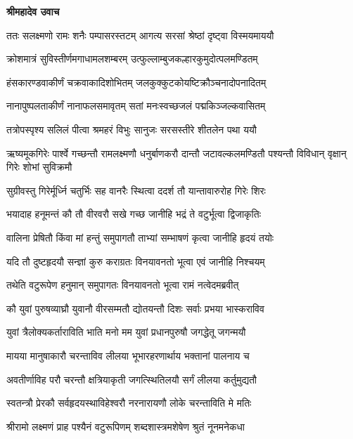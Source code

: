 




\textbf{श्रीमहादेव उवाच}

\twolineshloka
{ततः सलक्ष्मणो रामः शनैः पम्पासरस्तटम्}
{आगत्य सरसां श्रेष्ठां दृष्ट्वा विस्मयमाययौ} %

\twolineshloka
{क्रोशमात्रं सुविस्तीर्णमगाधामलशम्बरम्}
{उत्फुल्लाम्बुजकल्हारकुमुदोत्पलमण्डितम्} %

\twolineshloka
{हंसकारण्डवाकीर्णं चक्रवाकादिशोभितम्}
{जलकुक्कुटकोयष्टिक्रौञ्चनादोपनादितम्} %

\twolineshloka
{नानापुष्पलताकीर्णं नानाफलसमावृतम्}
{सतां मनःस्वच्छजलं पद्मकिञ्जल्कवासितम्} %

\twolineshloka
{तत्रोपस्पृश्य सलिलं पीत्वा श्रमहरं विभुः}
{सानुजः सरसस्तीरे शीतलेन पथा ययौ} %

\threelineshloka
{ऋष्यमूकगिरेः पार्श्वे गच्छन्तौ रामलक्ष्मणौ}
{धनुर्बाणकरौ दान्तौ जटावल्कलमण्डितौ}
{पश्यन्तौ विविधान् वृक्षान् गिरेः शोभां सुविक्रमौ} %

\twolineshloka
{सुग्रीवस्तु गिरेर्मूर्ध्नि चतुर्भिः सह वानरैः}
{स्थित्वा ददर्श तौ यान्तावारुरोह गिरेः शिरः} %

\twolineshloka
{भयादाह हनूमन्तं कौ तौ वीरवरौ सखे}
{गच्छ जानीहि भद्रं ते वटुर्भूत्वा द्विजाकृतिः} %

\twolineshloka
{वालिना प्रेषितौ किंवा मां हन्तुं समुपागतौ}
{ताभ्यां सम्भाषणं कृत्वा जानीहि हृदयं तयोः} %

\twolineshloka
{यदि तौ दुष्टहृदयौ सन्ज्ञां कुरु कराग्रतः}
{विनयावनतो भूत्वा एवं जानीहि निश्चयम्} %

\twolineshloka
{तथेति वटुरूपेण हनुमान् समुपागतः}
{विनयावनतो भूत्वा रामं नत्वेदमब्रवीत्} %

\twolineshloka
{कौ युवां पुरुषव्याघ्रौ युवानौ वीरसम्मतौ}
{द्योतयन्तौ दिशः सर्वाः प्रभया भास्कराविव} %

\twolineshloka
{युवां त्रैलोक्यकर्ताराविति भाति मनो मम}
{युवां प्रधानपुरुषौ जगद्धेतू जगन्मयौ} %

\twolineshloka
{मायया मानुषाकारौ चरन्ताविव लीलया}
{भूभारहरणार्थाय भक्तानां पालनाय च} %

\twolineshloka
{अवतीर्णाविह परौ चरन्तौ क्षत्रियाकृती}
{जगत्स्थितिलयौ सर्गं लीलया कर्तुमुद्यतौ} %

\twolineshloka
{स्वतन्त्रौ प्रेरकौ सर्वहृदयस्थाविहेश्वरौ}
{नरनारायणौ लोके चरन्ताविति मे मतिः} %

\twolineshloka
{श्रीरामो लक्ष्मणं प्राह पश्यैनं वटुरूपिणम्}
{शब्दशास्त्रमशेषेण श्रुतं नूनमनेकधा} %

